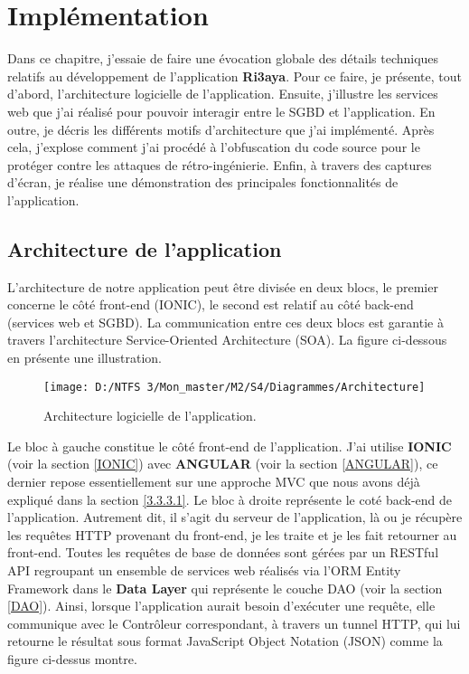 \let\cleardoublepage\clearpage

\chapter{Implémentation}
\label{sec:implementation}

Dans ce chapitre, j'essaie de faire une évocation globale des détails techniques relatifs au développement de l’application \textbf{Ri3aya}. Pour ce faire, je présente, tout d’abord, l’architecture logicielle de l'application. Ensuite, j'illustre les services web que j'ai réalisé pour pouvoir interagir entre le \gls{SGBD} et l’application. En outre, je décris les différents motifs d’architecture que j'ai implémenté. Après cela, j'explose comment j'ai procédé à l'obfuscation du code source pour le protéger contre les attaques de rétro-ingénierie. Enfin, à travers des captures d’écran, je réalise une démonstration des principales fonctionnalités de l’application.

\section{Architecture de l’application}
L’architecture de notre application peut être divisée en deux blocs, le premier concerne le côté front-end (IONIC), le second est relatif au côté back-end (services web et \gls{SGBD}). La communication entre ces deux blocs est garantie à travers l’architecture Service-Oriented Architecture (\gls{SOA}). La figure ci-dessous en présente une illustration.
\begin{figure}[h]
	\texttt{[image: D:/NTFS 3/Mon\_master/M2/S4/Diagrammes/Architecture]}
	\centering
	\caption{Architecture logicielle de l'application.}
	\label{Figure 5.1}
\end{figure}
\newline
Le bloc à gauche constitue le côté front-end de l'application. J'ai utilise \textbf{IONIC} (voir la section \ref{IONIC}) avec \textbf{ANGULAR} (voir la section \ref{ANGULAR}), ce dernier repose essentiellement sur une approche \gls{MVC} que nous avons déjà expliqué dans la section \ref{3.3.3.1}. \newline
Le bloc à droite représente le coté back-end de l'application. Autrement dit, il s'agit du serveur de l'application, là ou je récupère les requêtes \gls{HTTP} provenant du front-end, je les traite et je les fait retourner au front-end. \newline
Toutes les requêtes de base de données sont gérées par un RESTful \gls{API} regroupant un ensemble de services web réalisés via l'\gls{ORM} Entity Framework dans le \textbf{Data Layer} qui représente le couche \gls{DAO} (voir la section \ref{DAO}). Ainsi, lorsque l’application aurait besoin d’exécuter une requête, elle communique avec le Contrôleur correspondant, à travers un tunnel \gls{HTTP}, qui lui retourne le résultat sous format JavaScript Object Notation (\gls{JSON}) comme la figure ci-dessus montre.

